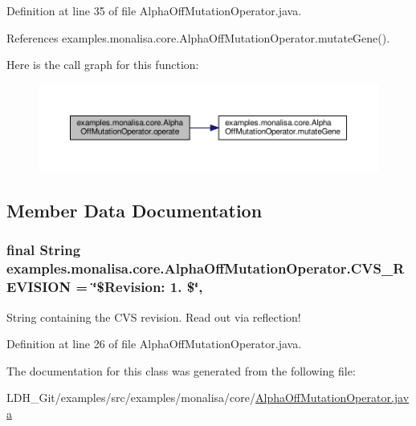 Definition at line 35 of file Alpha\-Off\-Mutation\-Operator.\-java.



References examples.\-monalisa.\-core.\-Alpha\-Off\-Mutation\-Operator.\-mutate\-Gene().



Here is the call graph for this function\-:
\nopagebreak
\begin{figure}[H]
\begin{center}
\leavevmode
\includegraphics[width=350pt]{classexamples_1_1monalisa_1_1core_1_1_alpha_off_mutation_operator_a68240b26bc561f24ab1251cc97ae9252_cgraph}
\end{center}
\end{figure}




\subsection{Member Data Documentation}
\hypertarget{classexamples_1_1monalisa_1_1core_1_1_alpha_off_mutation_operator_ab0525b184bc11a073f4c5cb9a0dcad1d}{
\subsubsection[{C\-V\-S\-\_\-\-R\-E\-V\-I\-S\-I\-O\-N}]{\setlength{\rightskip}{0pt plus 5cm}final String examples.\-monalisa.\-core.\-Alpha\-Off\-Mutation\-Operator.\-C\-V\-S\-\_\-\-R\-E\-V\-I\-S\-I\-O\-N = \char`\"{}\$Revision\-: 1. \$\char`\"{}\hspace{0.3cm}{\ttfamily [static]}, {\ttfamily [private]}}}\label{classexamples_1_1monalisa_1_1core_1_1_alpha_off_mutation_operator_ab0525b184bc11a073f4c5cb9a0dcad1d}
String containing the C\-V\-S revision. Read out via reflection! 

Definition at line 26 of file Alpha\-Off\-Mutation\-Operator.\-java.



The documentation for this class was generated from the following file\-:\begin{DoxyCompactItemize}
\item 
L\-D\-H\-\_\-\-Git/examples/src/examples/monalisa/core/\hyperlink{_alpha_off_mutation_operator_8java}{Alpha\-Off\-Mutation\-Operator.\-java}\end{DoxyCompactItemize}
